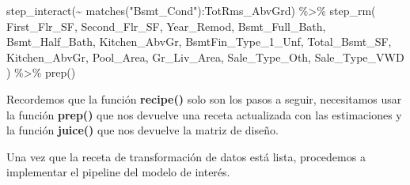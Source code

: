 \documentclass[
]{book}
\newenvironment{Shaded}{\begin{snugshade}}{\end{snugshade}}
\newcommand{\FunctionTok}[1]{\textcolor[rgb]{0.00,0.00,0.00}{#1}}
\newcommand{\NormalTok}[1]{#1}
\newcommand{\SpecialCharTok}[1]{\textcolor[rgb]{0.00,0.00,0.00}{#1}}
\newcommand{\StringTok}[1]{\textcolor[rgb]{0.31,0.60,0.02}{#1}}
\begin{document}
\begin{Shaded}
\begin{Highlighting}[]
  \FunctionTok{step\_interact}\NormalTok{(}\SpecialCharTok{\textasciitilde{}} \FunctionTok{matches}\NormalTok{(}\StringTok{"Bsmt\_Cond"}\NormalTok{)}\SpecialCharTok{:}\NormalTok{TotRms\_AbvGrd) }\SpecialCharTok{\%\textgreater{}\%} 
  \FunctionTok{step\_rm}\NormalTok{(}
\NormalTok{    First\_Flr\_SF, Second\_Flr\_SF, Year\_Remod,}
\NormalTok{    Bsmt\_Full\_Bath, Bsmt\_Half\_Bath, }
\NormalTok{    Kitchen\_AbvGr, BsmtFin\_Type\_1\_Unf, }
\NormalTok{    Total\_Bsmt\_SF, Kitchen\_AbvGr, Pool\_Area, }
\NormalTok{    Gr\_Liv\_Area, Sale\_Type\_Oth, Sale\_Type\_VWD}
\NormalTok{  ) }\SpecialCharTok{\%\textgreater{}\%} 
  \FunctionTok{prep}\NormalTok{()}
\end{Highlighting}
\end{Shaded}

Recordemos que la función \textbf{recipe()} solo son los pasos a seguir, necesitamos usar la función \textbf{prep()} que nos devuelve una receta actualizada con las estimaciones y la función \textbf{juice()} que nos devuelve la matriz de diseño.

Una vez que la receta de transformación de datos está lista, procedemos a implementar el pipeline del modelo de interés.
\end{document}
